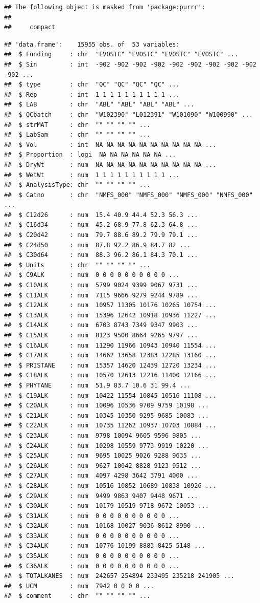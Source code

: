 \documentclass[]{article}
\begin{document}
\begin{verbatim}
## The following object is masked from 'package:purrr':
## 
##     compact
\end{verbatim}

\begin{verbatim}
## 'data.frame':    15955 obs. of  53 variables:
##  $ Funding     : chr  "EVOSTC" "EVOSTC" "EVOSTC" "EVOSTC" ...
##  $ Sin         : int  -902 -902 -902 -902 -902 -902 -902 -902 -902 -902 ...
##  $ type        : chr  "QC" "QC" "QC" "QC" ...
##  $ Rep         : int  1 1 1 1 1 1 1 1 1 1 ...
##  $ LAB         : chr  "ABL" "ABL" "ABL" "ABL" ...
##  $ QCbatch     : chr  "W102390" "L012391" "W101090" "W100990" ...
##  $ strMAT      : chr  "" "" "" "" ...
##  $ LabSam      : chr  "" "" "" "" ...
##  $ Vol         : int  NA NA NA NA NA NA NA NA NA NA ...
##  $ Proportion  : logi  NA NA NA NA NA NA ...
##  $ DryWt       : num  NA NA NA NA NA NA NA NA NA NA ...
##  $ WetWt       : num  1 1 1 1 1 1 1 1 1 1 ...
##  $ AnalysisType: chr  "" "" "" "" ...
##  $ Catno       : chr  "NMFS_000" "NMFS_000" "NMFS_000" "NMFS_000" ...
##  $ C12d26      : num  15.4 40.9 44.4 52.3 56.3 ...
##  $ C16d34      : num  45.2 68.9 77.8 62.3 64.8 ...
##  $ C20d42      : num  79.7 88.6 89.2 79.9 79.1 ...
##  $ C24d50      : num  87.8 92.2 86.9 84.7 82 ...
##  $ C30d64      : num  88.3 96.2 86.1 84.3 70.1 ...
##  $ Units       : chr  "" "" "" "" ...
##  $ C9ALK       : num  0 0 0 0 0 0 0 0 0 0 ...
##  $ C10ALK      : num  5799 9024 9399 9067 9731 ...
##  $ C11ALK      : num  7115 9666 9279 9244 9789 ...
##  $ C12ALK      : num  10957 11305 10176 10265 10754 ...
##  $ C13ALK      : num  15396 12642 10918 10936 11227 ...
##  $ C14ALK      : num  6703 8743 7349 9347 9903 ...
##  $ C15ALK      : num  8123 9500 8664 9265 9797 ...
##  $ C16ALK      : num  11290 11966 10943 10940 11554 ...
##  $ C17ALK      : num  14662 13658 12383 12285 13160 ...
##  $ PRISTANE    : num  15357 14620 12439 12720 13234 ...
##  $ C18ALK      : num  10570 12613 12216 11400 12166 ...
##  $ PHYTANE     : num  51.9 83.7 10.6 31 99.4 ...
##  $ C19ALK      : num  10422 11554 10845 10516 11108 ...
##  $ C20ALK      : num  10096 10536 9709 9759 10198 ...
##  $ C21ALK      : num  10345 10350 9295 9685 10083 ...
##  $ C22ALK      : num  10735 11262 10937 10703 10884 ...
##  $ C23ALK      : num  9798 10094 9605 9596 9805 ...
##  $ C24ALK      : num  10298 10559 9773 9919 10220 ...
##  $ C25ALK      : num  9695 10025 9026 9288 9635 ...
##  $ C26ALK      : num  9627 10042 8828 9123 9512 ...
##  $ C27ALK      : num  4097 4298 3642 3791 4000 ...
##  $ C28ALK      : num  10516 10852 10689 10838 10926 ...
##  $ C29ALK      : num  9499 9863 9407 9448 9671 ...
##  $ C30ALK      : num  10179 10519 9718 9672 10053 ...
##  $ C31ALK      : num  0 0 0 0 0 0 0 0 0 0 ...
##  $ C32ALK      : num  10168 10027 9036 8612 8990 ...
##  $ C33ALK      : num  0 0 0 0 0 0 0 0 0 0 ...
##  $ C34ALK      : num  10776 10199 8883 8425 5148 ...
##  $ C35ALK      : num  0 0 0 0 0 0 0 0 0 0 ...
##  $ C36ALK      : num  0 0 0 0 0 0 0 0 0 0 ...
##  $ TOTALKANES  : num  242657 254894 233495 235218 241905 ...
##  $ UCM         : num  7942 0 0 0 0 ...
##  $ comment     : chr  "" "" "" "" ...
\end{verbatim}
\end{document}
